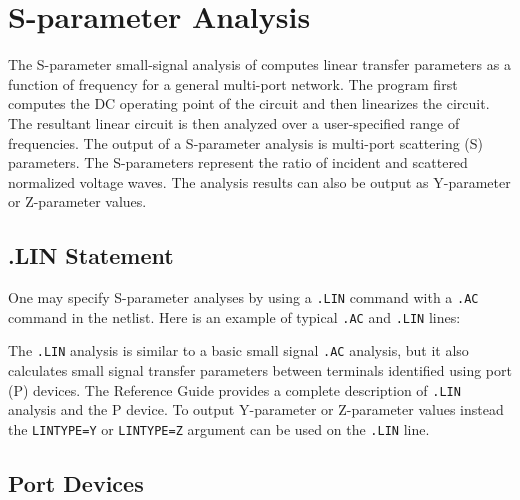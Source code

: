\clearpage



\section{S-parameter Analysis}
\label{SP_Analysis}
\label{SP_Sweep_Overview}
  
 

The S-parameter small-signal analysis of \Xyce{} computes linear
transfer parameters as a function of frequency for a general
multi-port network. The program first computes the DC operating point
of the circuit and then linearizes the circuit. The resultant linear
circuit is then analyzed over a user-specified range of
frequencies. The output of a S-parameter analysis is multi-port
scattering (S) parameters. The S-parameters represent the ratio of
incident and scattered normalized voltage waves.  The analysis results
can also be output as Y-parameter or Z-parameter values.

\subsection{.LIN Statement}

One may specify S-parameter analyses by using a \verb|.LIN| command with a \verb|.AC| command in the netlist.
Here is an example of typical \verb|.AC| and \verb|.LIN| lines:


The \verb|.LIN| analysis is similar to a basic small signal \verb|.AC|
analysis, but it also calculates small signal transfer parameters
between terminals identified using port (P) devices. The \Xyce{}
Reference Guide\ReferenceGuide{} provides a complete description of
\verb|.LIN| analysis and the P device.  To output Y-parameter or
Z-parameter values instead the \texttt{LINTYPE=Y} or
\texttt{LINTYPE=Z} argument can be used on the \texttt{.LIN} line.

\subsection{Port Devices}
\label{SP_Port}

